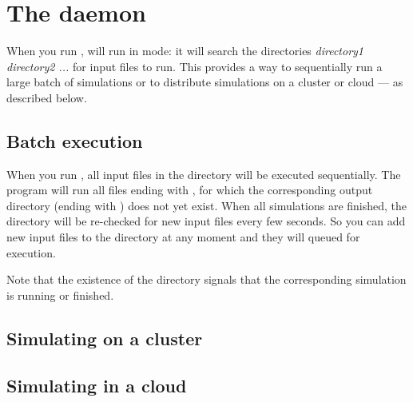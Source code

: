 \section{The \prog daemon}

When you run \prog {}   , \prog will run in  mode: it will search the directories \emph{directory1 directory2 ...} for input files to run. This provides a way to sequentially run a large batch of simulations or to distribute simulations on a cluster or cloud --- as described below.

\subsection{Batch execution}

When you run \prog {} , all input files in the directory will be executed sequentially. The program will run all files ending with , for which the corresponding output directory (ending with ) does not yet exist.  When all simulations are finished, the directory will be re-checked for new input files every few seconds. So you can add new input files to the directory at any moment and they will queued for execution.

Note that the existence of the  directory signals that the corresponding simulation is running or finished. 

\subsection{Simulating on a cluster}

\subsection{Simulating in a cloud}
